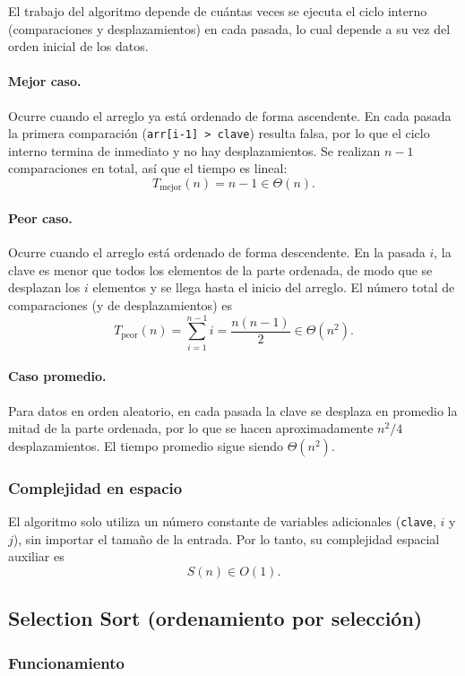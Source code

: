 \documentclass[11pt,letterpaper]{article}
\begin{document}
El trabajo del algoritmo depende de cuántas veces se ejecuta el ciclo interno (comparaciones y desplazamientos) en cada pasada, lo cual depende a su vez del orden inicial de los datos.

\paragraph{Mejor caso.} Ocurre cuando el arreglo ya está ordenado de forma ascendente. En cada pasada la primera comparación (\texttt{arr[i-1] > clave}) resulta falsa, por lo que el ciclo interno termina de inmediato y no hay desplazamientos. Se realizan $n-1$ comparaciones en total, así que el tiempo es lineal:
\[
  T_{\text{mejor}}(n) = n - 1 \in \Theta(n).
\]

\paragraph{Peor caso.} Ocurre cuando el arreglo está ordenado de forma descendente. En la pasada $i$, la clave es menor que todos los elementos de la parte ordenada, de modo que se desplazan los $i$ elementos y se llega hasta el inicio del arreglo. El número total de comparaciones (y de desplazamientos) es
\[
  T_{\text{peor}}(n) = \sum_{i=1}^{n-1} i = \frac{n(n-1)}{2} \in \Theta(n^2).
\]

\paragraph{Caso promedio.} Para datos en orden aleatorio, en cada pasada la clave se desplaza en promedio la mitad de la parte ordenada, por lo que se hacen aproximadamente $n^2/4$ desplazamientos. El tiempo promedio sigue siendo $\Theta(n^2)$.

\subsubsection{Complejidad en espacio}

El algoritmo solo utiliza un número constante de variables adicionales (\texttt{clave}, $i$ y $j$), sin importar el tamaño de la entrada. Por lo tanto, su complejidad espacial auxiliar es
\[
  S(n) \in O(1).
\]

\subsection{Selection Sort (ordenamiento por selección)}
\subsubsection{Funcionamiento}
\end{document}
